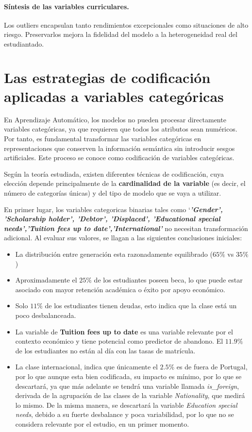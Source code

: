 \documentclass{report}[14pt]
\begin{document}
\paragraph{Síntesis de las variables curriculares.}  Los outliers encapsulan tanto rendimientos excepcionales como situaciones de alto riesgo.  Preservarlos mejora la fidelidad del modelo a la heterogeneidad real del estudiantado.
\section{Las estrategias de codificación aplicadas a variables categóricas}
En Aprendizaje Automático, los modelos no pueden procesar directamente variables categóricas, ya que requieren que todos los atributos sean numéricos. Por tanto, es fundamental transformar las variables categóricas en representaciones que conserven la información semántica sin introducir sesgos artificiales. Este proceso se conoce como codificación de variables categóricas.

Según la teoría estudiada, existen diferentes técnicas de codificación, cuya elección depende principalmente de la \textbf{cardinalidad de la variable} (es decir, el número de categorías únicas) y del tipo de modelo que se vaya a utilizar.

En primer lugar, los variables categoricas binarias tales como `\textbf{\textit{'Gender', 'Scholarship holder', 'Debtor', 'Displaced', 'Educational special needs','Tuition fees up to date','International' }} no necesitan transformación adicional.  Al evaluar sus valores, se llagan a las siguientes conclusiones iniciales:
\begin{itemize}
    \item La distribución entre generación esta razonadamente equilibrado ($65\%$ vs $35\%$) 
    \item Aproximadamente el $25\%$ de los estudiantes poseen beca, lo que puede estar asociado con mayor retención académica o éxito por apoyo económico.
    \item Solo $11\%$ de los estudiantes tienen deudas, esto indica que la clase está un poco desbalanceada.
    \item La variable de \textbf{Tuition fees up to date} es una variable relevante por el contexto económico y tiene potencial como predictor de abandono. El $11.9\%$ de los estudiantes no están al día con las tasas de matrícula.
    \item  La clase internacional, indica que únicamente el $2.5\%$ es de fuera de Portugal, por lo que aunque esta bien codificada, su impacto es mínimo, por lo que se descartará, ya que más adelante se tendrá una variable llamada \textit{is\_foreign}, derivada de la agrupación de las clases de la variable \textit{Nationality}, que medirá lo mismo. De la misma manera, se descartará la variable \textit{Education special needs}, debido a su fuerte desbalance y poca variabilidad, por lo que no se considera relevante por el estudio, en un primer momento.
\end{itemize}
\end{document}
